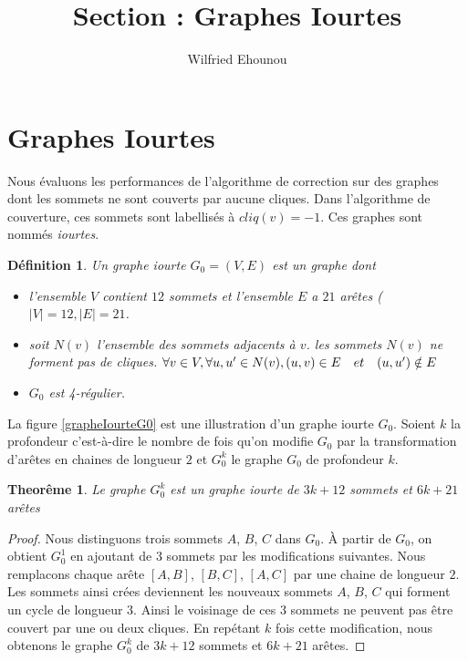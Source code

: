 \documentclass[onecolumn, 12pt]{book}
\title{Section : Graphes Iourtes}
\author{Wilfried Ehounou}
\date{\oldstylenums{\today}}
\newtheorem{definition}{D\'efinition}
\newtheorem{theorem}{Theor\^eme}
\begin{document}
\maketitle
\tableofcontents

\section{Graphes Iourtes}
Nous \'evaluons les performances de l'algorithme de correction sur des graphes dont les sommets ne sont couverts par aucune cliques. Dans l'algorithme de couverture, ces sommets sont labellis\'es \`a $cliq(v) = -1$. Ces graphes sont nomm\'es {\em iourtes}.

\begin{definition}
Un graphe iourte $G_0 = (V, E)$ est un graphe dont
\begin{itemize}
	\item l'ensemble $V$ contient $12$ sommets et l'ensemble $E$ a $21$ ar\^etes ($|V| = 12, |E| = 21$.
	\item soit $N(v)$ l'ensemble des sommets adjacents \`a $v$. 
		les sommets $N(v)$ ne forment pas de cliques. \newline
		$\forall v \in V, \forall u, u' \in N(v),  (u, v) \in E \hspace{1 em} et  \hspace{1 em} (u, u') \notin E $
	\item $G_0$ est {\em 4-r\'egulier}.
\end{itemize}
\end{definition}
La figure \ref{grapheIourteG0} est une illustration d'un graphe iourte $G_0$.\newline
Soient $k$ la profondeur c'est-\`a-dire le nombre de fois qu'on modifie $G_0$ par la transformation d'ar\^etes en chaines de longueur $2$ et $G_0^k$ le graphe $G_0$ de profondeur $k$.

\begin{theorem}
Le graphe $G_0^k$ est un graphe iourte de $3k+12$ sommets et $6k + 21$ ar\^etes
\end{theorem} 

\begin{proof}
Nous distinguons trois sommets $A$, $B$, $C$ dans $G_0$. 
\`A partir de $G_0$, on obtient $G_0^1$ en ajoutant de $3$ sommets par les modifications  suivantes.
Nous remplacons chaque ar\^ete $[A,B]$, $[B,C]$,  $[A,C]$  par une chaine de longueur $2$. 
Les sommets ainsi cr\'ees deviennent les nouveaux sommets   $A$, $B$, $C$ qui forment un cycle de longueur $3$.
Ainsi le voisinage de ces $3$ sommets  ne peuvent pas \^etre couvert par une ou deux cliques.
En rep\'etant $k$ fois cette modification, nous obtenons le graphe $G_0^k$ de $3k+12$ sommets et $6k+21$ ar\^etes.
\end{proof}
\end{document}
